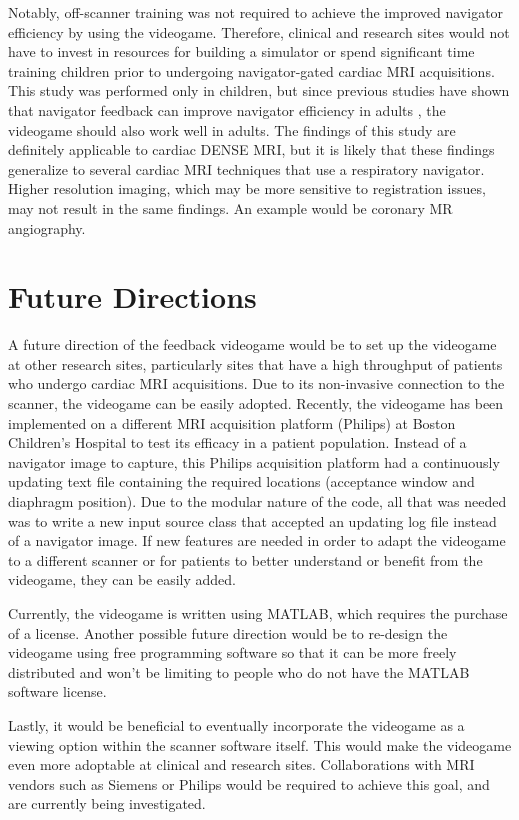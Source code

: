 	Notably, off-scanner training was not required to achieve the improved navigator efficiency by using the videogame. Therefore, clinical and research sites would not have to invest in resources for building a simulator or spend significant time training children prior to undergoing navigator-gated cardiac MRI acquisitions. This study was performed only in children, but since previous studies have shown that navigator feedback can improve navigator efficiency in adults \cite{Feuerlein2009,Liu1993}, the videogame should also work well in adults. The findings of this study are definitely applicable to cardiac DENSE MRI, but it is likely that these findings generalize to several cardiac MRI techniques that use a respiratory navigator. Higher resolution imaging, which may be more sensitive to registration issues, may not result in the same findings. An example would be coronary MR angiography.

\section{Future Directions}
	A future direction of the feedback videogame would be to set up the videogame at other research sites, particularly sites that have a high throughput of patients who undergo cardiac MRI acquisitions. Due to its non-invasive connection to the scanner, the videogame can be easily adopted. Recently, the videogame has been implemented on a different MRI acquisition platform (Philips) at Boston Children's Hospital to test its efficacy in a patient population. Instead of a navigator image to capture, this Philips acquisition platform had a continuously updating text file containing the required locations (acceptance window and diaphragm position). Due to the modular nature of the code, all that was needed was to write a new input source class that accepted an updating log file instead of a navigator image. If new features are needed in order to adapt the videogame to a different scanner or for patients to better understand or benefit from the videogame, they can be easily added.
	
	Currently, the videogame is written using MATLAB, which requires the purchase of a license. Another possible future direction would be to re-design the videogame using free programming software so that it can be more freely distributed and won't be limiting to people who do not have the MATLAB software license. 
	
	Lastly, it would be beneficial to eventually incorporate the videogame as a viewing option within the scanner software itself. This would make the videogame even more adoptable at clinical and research sites. Collaborations with MRI vendors such as Siemens or Philips would be required to achieve this goal, and are currently being investigated.


